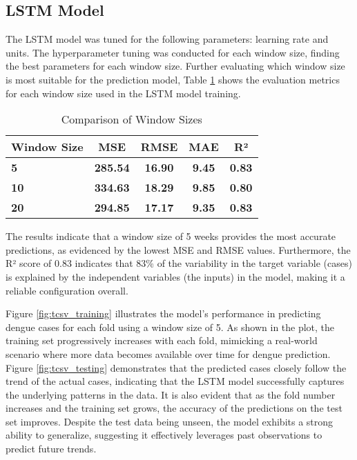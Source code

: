 \subsection{LSTM Model}
The LSTM model was tuned for the following parameters: learning rate and units. The hyperparameter tuning was conducted for each window size, finding the best parameters for each window size. Further evaluating which window size is most suitable for the prediction model, Table \ref{tab:comparison_of_lstm} shows the evaluation metrics for each window size used in the LSTM model training.
\begin{table}[h!]
	\centering
	\begin{tabular}{|l|c|c|c|c|}
		\hline
		\textbf{Window Size} & \textbf{MSE} & \textbf{RMSE} & \textbf{MAE} & \textbf{R²}\\ \hline
		\textbf{5} & \textbf{285.54} & \textbf{16.90} & \textbf{9.45} & \textbf{0.83}\\ \hline
		\textbf{10} & \textbf{334.63} & \textbf{18.29} & \textbf{9.85} & \textbf{0.80}\\ \hline
		\textbf{20} & \textbf{294.85} & \textbf{17.17} & \textbf{9.35} & \textbf{0.83}\\ \hline
	\end{tabular}
	\caption{Comparison of Window Sizes}
	\label{tab:comparison_of_lstm}
\end{table}

The results indicate that a window size of 5 weeks provides the most accurate predictions, as evidenced by the lowest MSE and RMSE values. Furthermore, the R² score of 0.83 indicates that 83\% of the variability in the target variable (cases) is explained by the independent variables (the inputs) in the model, making it a reliable configuration overall.

Figure \ref{fig:tcsv_training} illustrates the model’s performance in predicting dengue cases for each fold using a window size of 5. As shown in the plot, the training set progressively increases with each fold, mimicking a real-world scenario where more data becomes available over time for dengue prediction. Figure \ref{fig:tcsv_testing} demonstrates that the predicted cases closely follow the trend of the actual cases, indicating that the LSTM model successfully captures the underlying patterns in the data. It is also evident that as the fold number increases and the training set grows, the accuracy of the predictions on the test set improves. Despite the test data being unseen, the model exhibits a strong ability to generalize, suggesting it effectively leverages past observations to predict future trends.

